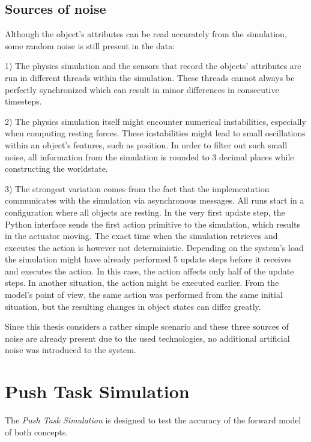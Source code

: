 \subsection{Sources of noise}

Although the object's attributes can be read accurately from the simulation, some random noise is still present in the data: 

1) The physics simulation and the sensors that record the objects' attributes are run in different threads within the simulation. These threads cannot always be perfectly synchronized which can result in minor differences in consecutive timesteps. 

2) The physics simulation itself might encounter numerical instabilities, especially when computing resting forces. These instabilities
might lead to small oscillations within an object's features, such as position. In order to filter out such small noise, all
information from the simulation is rounded to 3 decimal places while constructing the worldstate. 

3) The strongest variation comes from the fact that the implementation communicates with the simulation via asynchronous messages. 
All runs start in a configuration where all objects are resting. In the very first update step, the Python interface sends the first
action primitive to the simulation, which results in the actuator moving. The exact time when the simulation retrieves and executes
the action is however not deterministic. Depending on the system's load the simulation might have already performed 5 update steps before
it receives and executes the action. In this case, the action affects only half of the update steps. In another situation, the action might
be executed earlier. From the model's point of view, the same action was performed from the same initial situation, but the resulting changes in object states can differ greatly. 

Since this thesis considers a rather simple scenario and these three sources of noise are already present due to the used technologies,
no additional artificial noise was introduced to the system.

\section{Push Task Simulation \label{sec:pushTaskSim}}

The \textit{Push Task Simulation} is designed to test the accuracy of the forward model of both concepts. 

